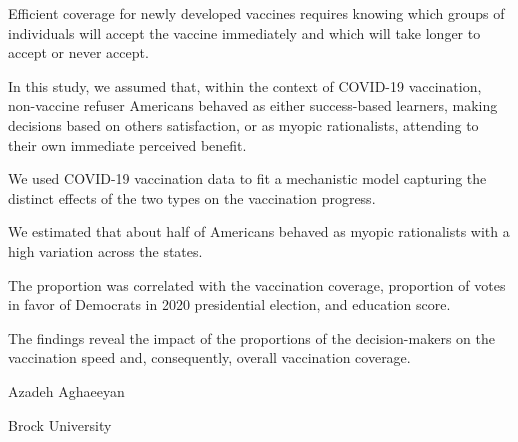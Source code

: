 Efficient coverage for newly developed vaccines requires knowing which
groups of individuals will accept the vaccine immediately and which will
take longer to accept or never accept.

In this study, we assumed that, within the context of COVID-19
vaccination, non-vaccine refuser Americans behaved as either
success-based learners, making decisions based on
others\textquotesingle{} satisfaction, or as myopic rationalists,
attending to their own immediate perceived benefit.

We used COVID-19 vaccination data to fit a mechanistic model capturing
the distinct effects of the two types on the vaccination progress.

We estimated that about half of Americans behaved as myopic rationalists
with a high variation across the states.

The proportion was correlated with the vaccination coverage, proportion
of votes in favor of Democrats in 2020 presidential election, and
education score.

The findings reveal the impact of the proportions of the decision-makers
on the vaccination speed and, consequently, overall vaccination
coverage.

Azadeh Aghaeeyan

Brock University
